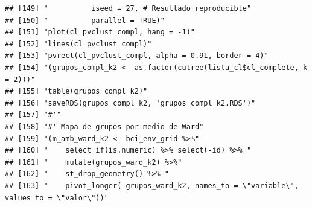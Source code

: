 \documentclass[11pt,]{article}
\begin{document}
\begin{verbatim}
## [149] "          iseed = 27, # Resultado reproducible"                                                                                                                        
## [150] "          parallel = TRUE)"                                                                                                                                            
## [151] "plot(cl_pvclust_compl, hang = -1)"                                                                                                                                     
## [152] "lines(cl_pvclust_compl)"                                                                                                                                               
## [153] "pvrect(cl_pvclust_compl, alpha = 0.91, border = 4)"                                                                                                                    
## [154] "(grupos_compl_k2 <- as.factor(cutree(lista_cl$cl_complete, k = 2)))"                                                                                                   
## [155] "table(grupos_compl_k2)"                                                                                                                                                
## [156] "saveRDS(grupos_compl_k2, 'grupos_compl_k2.RDS')"                                                                                                                       
## [157] "#'"                                                                                                                                                                    
## [158] "#' Mapa de grupos por medio de Ward"                                                                                                                                   
## [159] "(m_amb_ward_k2 <- bci_env_grid %>%"                                                                                                                                    
## [160] "    select_if(is.numeric) %>% select(-id) %>% "                                                                                                                        
## [161] "    mutate(grupos_ward_k2) %>%"                                                                                                                                        
## [162] "    st_drop_geometry() %>% "                                                                                                                                           
## [163] "    pivot_longer(-grupos_ward_k2, names_to = \"variable\", values_to = \"valor\"))"                                                                                    

\end{verbatim}
\end{document}
